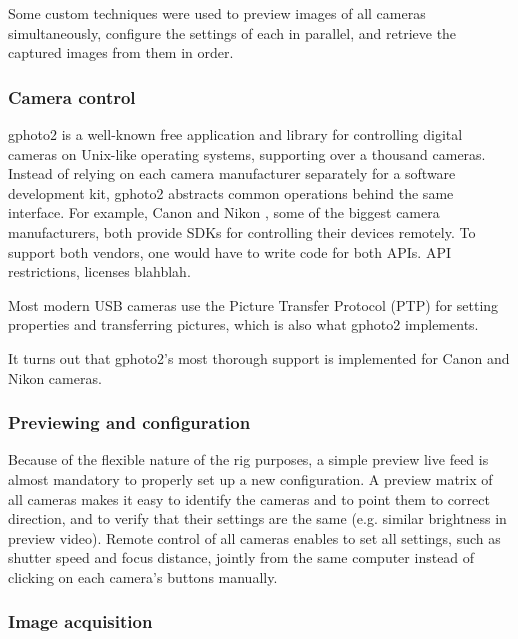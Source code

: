 Some custom techniques were used to preview images of all cameras simultaneously, configure the settings of each in parallel, and retrieve the captured images from them in order.


\subsubsection{Camera control} %

gphoto2 \cite{gphoto2} is a well-known free application and library for controlling digital cameras on Unix-like operating systems, supporting over a thousand cameras.
Instead of relying on each camera manufacturer separately for a software development kit, gphoto2 abstracts common operations behind the same interface.
For example, Canon \cite{canonsdk} and Nikon \cite{nikonsdk}, some of the biggest camera manufacturers, both provide SDKs for controlling their devices remotely.
To support both vendors, one would have to write code for both APIs.
API restrictions, licenses blahblah.

Most modern USB cameras use the Picture Transfer Protocol (PTP) \cite{ptpTODO} for setting properties and transferring pictures, which is also what gphoto2 implements.

It turns out that gphoto2's most thorough support is implemented for Canon and Nikon cameras.


\subsubsection{Previewing and configuration} %

Because of the flexible nature of the rig purposes, a simple preview live feed is almost mandatory to properly set up a new configuration.
A preview matrix of all cameras makes it easy to identify the cameras and to point them to correct direction, and to verify that their settings are the same (e.g. similar brightness in preview video).
Remote control of all cameras enables to set all settings, such as shutter speed and focus distance, jointly from the same computer instead of clicking on each camera's buttons manually.



\subsubsection{Image acquisition} %

